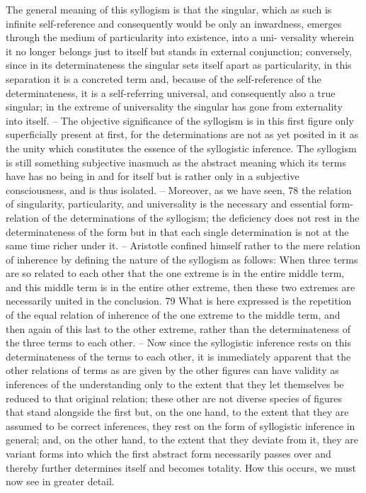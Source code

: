 The general meaning of this syllogism is that the singular, which as such
is infinite self-reference and consequently would be only an inwardness,
emerges through the medium of particularity into existence, into a uni-
versality wherein it no longer belongs just to itself but stands in external
conjunction; conversely, since in its determinateness the singular sets itself
apart as particularity, in this separation it is a concreted term and, because
of the self-reference of the determinateness, it is a self-referring universal,
and consequently also a true singular; in the extreme of universality the
singular has gone from externality into itself. – The objective significance
of the syllogism is in this first figure only superficially present at first, for the
determinations are not as yet posited in it as the unity which constitutes
the essence of the syllogistic inference. The syllogism is still something
subjective inasmuch as the abstract meaning which its terms have has no
being in and for itself but is rather only in a subjective consciousness, and
is thus isolated. – Moreover, as we have seen, 78 the relation of singularity,
particularity, and universality is the necessary and essential form-relation of
the determinations of the syllogism; the deficiency does not rest in the
determinateness of the form but in that each single determination is not
at the same time richer under it. – Aristotle confined himself rather to
the mere relation of inherence by defining the nature of the syllogism as
follows: When three terms are so related to each other that the one extreme
is in the entire middle term, and this middle term is in the entire other
extreme, then these two extremes are necessarily united in the conclusion. 79
What is here expressed is the repetition of the equal relation of inherence
of the one extreme to the middle term, and then again of this last to the
other extreme, rather than the determinateness of the three terms to each
other. – Now since the syllogistic inference rests on this determinateness of
the terms to each other, it is immediately apparent that the other relations
of terms as are given by the other figures can have validity as inferences of
the understanding only to the extent that they let themselves be reduced to
that original relation; these other are not diverse species of figures that stand
alongside the first but, on the one hand, to the extent that they are assumed
to be correct inferences, they rest on the form of syllogistic inference in
general; and, on the other hand, to the extent that they deviate from it,
they are variant forms into which the first abstract form necessarily passes
over and thereby further determines itself and becomes totality. How this
occurs, we must now see in greater detail.

